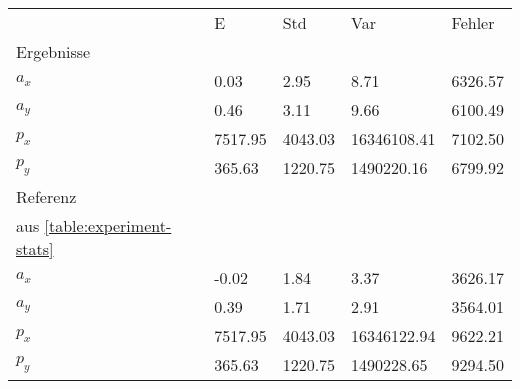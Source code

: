 \begin{tabular}{l|l|l|l|l}

     & E   & Std    & Var    & Fehler \\
\hhline{=|=|=|=|=}

Ergebnisse & & & & \\
$a_x$  &         0.03 &         2.95 &         8.71 &      6326.57 \\
$a_y$  &         0.46 &         3.11 &         9.66 &      6100.49 \\
$p_x$  &      7517.95 &      4043.03 &  16346108.41 &      7102.50 \\
$p_y$  &       365.63 &      1220.75 &   1490220.16 &      6799.92 \\

\hline
Referenz & & & & \\
aus \ref{table:experiment-stats} & & & & \\
$a_x$  &        -0.02 &         1.84 &         3.37 &      3626.17 \\
$a_y$  &         0.39 &         1.71 &         2.91 &      3564.01 \\
$p_x$  &      7517.95 &      4043.03 &  16346122.94 &      9622.21 \\
$p_y$  &       365.63 &      1220.75 &   1490228.65 &      9294.50 \\
\end{tabular}
